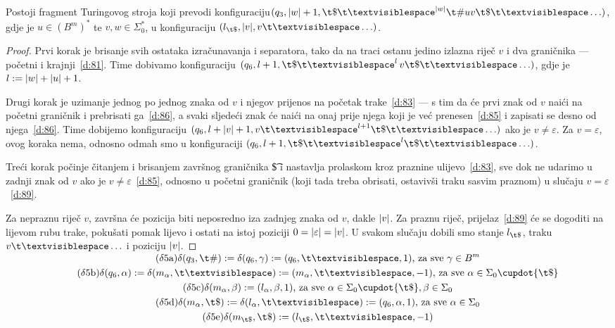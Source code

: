 \begin{lema}[{name=[peti fragment transpiliranog stroja]}]\label{lm:faza5}
Postoji fragment Turingovog stroja koji prevodi konfiguraciju\newline $(q_3,\dulj w+1,\t\$\bl^{\dulj w}\t\#uv\t\$\bl\ldots)$, gdje je $u\in(B^m)^*$ te $v,w\in\Sigma_0^*$, u konfiguraciju $(l_{\t\$},\dulj v,v\bl\ldots)$.
\end{lema}
\begin{proof}
Prvi korak je brisanje svih ostataka izračunavanja i separatora, tako da na traci ostanu jedino izlazna riječ $v$ i dva graničnika --- početni i krajnji~\eqref{d:81}. Time dobivamo konfiguraciju $(q_6,l+1,\t\$\bl^l\,v\t\$\bl\ldots)$, gdje je $l:=\lvert w\rvert+\lvert u\rvert+1$.

Drugi korak je uzimanje jednog po jednog znaka od $v$ i njegov prijenos na početak trake~\eqref{d:83} --- s tim da će prvi znak od $v$ naići na početni graničnik i prebrisati ga~\eqref{d:86}, a svaki sljedeći znak će naići na onaj prije njega koji je već prenesen~\eqref{d:85} i zapisati se desno od njega~\eqref{d:86}. Time dobijemo konfiguraciju $(q_6,l+\dulj v+1,v\bl^{l+1}\t\$\bl\ldots)$ ako je $v\ne\varepsilon$. Za $v=\varepsilon$, ovog koraka nema, odnosno odmah smo u konfiguraciji $(q_6,l+1,\t\$\bl^l\t\$\bl\ldots)$.

Treći korak počinje čitanjem i brisanjem završnog graničnika \t\$ i nastavlja prolaskom kroz praznine ulijevo~\eqref{d:83}, sve dok ne udarimo u zadnji znak od $v$ ako je $v\ne\varepsilon$~\eqref{d:85}, odnosno u početni graničnik (koji tada treba obrisati, ostavivši traku sasvim praznom) u slučaju $v=\varepsilon$~\eqref{d:89}.

    Za nepraznu riječ $v$, završna će pozicija biti neposredno iza zadnjeg znaka od $v$, dakle $\lvert v\rvert$. Za praznu riječ, prijelaz~\eqref{d:89} će se dogoditi na lijevom rubu trake, pokušati pomak lijevo i ostati na istoj poziciji $0=\lvert\varepsilon\rvert=\lvert v\rvert$. U svakom slučaju dobili smo stanje $l_{\t\$}$, traku $v\bl\ldots$ i poziciju $\lvert v\rvert$.
\end{proof}

\noindent\begin{gather*}
    \SwapAboveDisplaySkip
\label{d:81}\tag{$\delta$5a}\delta(q_3,\t\#):=\delta(q_6,\gamma):=(q_6,\bl,1)\text{, za sve }\gamma\in B^m\\
    \label{d:83}\tag{$\delta$5b}\delta(q_6,\alpha):=\delta(m_\alpha,\bl):=(m_\alpha,\bl,-1)\text{, za sve }\alpha\in\Sigma_0\dcup\{\t\$\}\\
    \label{d:85}\tag{$\delta$5c}\delta(m_\alpha,\beta):=(l_\alpha,\beta,1)\text{, za sve }\alpha\in\Sigma_0\dcup\{\t\$\},\beta\in\Sigma_0\\
\label{d:86}\tag{$\delta$5d}\delta(m_\alpha,\t\$):=\delta(l_\alpha,\bl):=(q_6,\alpha,1)\text{, za sve }\alpha\in\Sigma_0\\
    \label{d:89}\tag{$\delta$5e}\delta(m_{\t\$},\t\$):=(l_{\t\$},\bl,-1)
\end{gather*}

